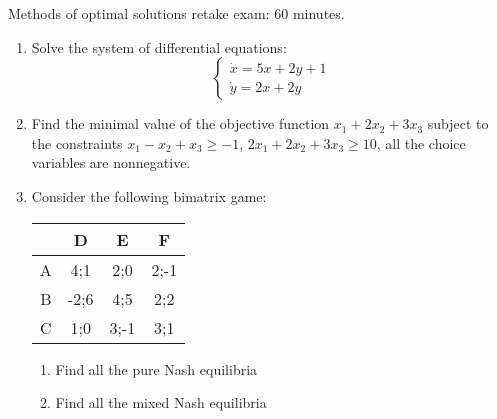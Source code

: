 \documentclass[12pt,a4paper]{article}
\begin{document}
Methods of optimal solutions retake exam: 60 minutes.

\begin{enumerate}

\item Solve the system of differential equations:
\[
\begin{cases}
\dot x=5x + 2y + 1\\
\dot y=2x + 2y
\end{cases}
\]

\item Find the minimal value of the objective function $x_1+2x_2+3x_3$ subject to the constraints  $x_1-x_2+x_3\geq -1$, $2x_1+2x_2+3x_3\geq 10$, all the choice variables are nonnegative.


\item   Consider the following bimatrix game:


\begin{tabular}{c|ccc}
 & D & E & F \\
\hline
A & 4;1 & 2;0 & 2;-1  \\
B & -2;6 & 4;5 & 2;2  \\
C & 1;0 & 3;-1 & 3;1  \\
\end{tabular}

\begin{enumerate}
\item Find all the pure  Nash equilibria
\item Find all the mixed Nash equilibria

\end{enumerate}

\end{enumerate}
\end{document}
